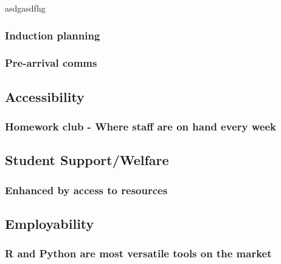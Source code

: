 \documentclass[
  11pt,
  letterpaper,
  oneside,
  open=any]{scrbook}
\begin{document}
asdgasdfhg

\hypertarget{induction-planning}{%
\subsubsection{Induction planning}\label{induction-planning}}

\hypertarget{pre-arrival-comms}{%
\subsubsection{Pre-arrival comms}\label{pre-arrival-comms}}

\hypertarget{accessibility}{%
\subsection{Accessibility}\label{accessibility}}

\hypertarget{homework-club---where-staff-are-on-hand-every-week}{%
\subsubsection{Homework club - Where staff are on hand every
week}\label{homework-club---where-staff-are-on-hand-every-week}}

\hypertarget{student-supportwelfare}{%
\subsection{Student Support/Welfare}\label{student-supportwelfare}}

\hypertarget{enhanced-by-access-to-resources}{%
\subsubsection{Enhanced by access to
resources}\label{enhanced-by-access-to-resources}}

\hypertarget{employability}{%
\subsection{Employability}\label{employability}}

\hypertarget{r-and-python-are-most-versatile-tools-on-the-market}{%
\subsubsection{R and Python are most versatile tools on the
market}\label{r-and-python-are-most-versatile-tools-on-the-market}}
\end{document}
